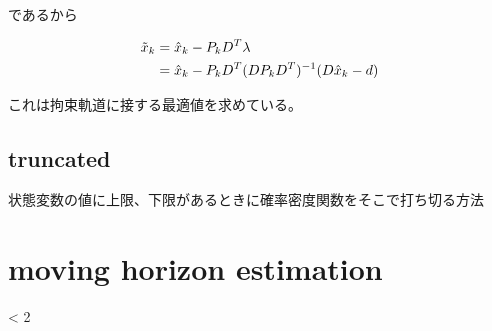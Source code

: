 であるから

\begin{align}
\tilde{x}_k
&=
\hat{x}_k - P_k D^T \lambda 			\notag\\
&=
\hat{x}_k - P_k D^T (DP_k D^T)^{-1}(D\hat{x}_k-d)
\end{align}

これは拘束軌道に接する最適値を求めている。

\subsection{truncated}
状態変数の値に上限、下限があるときに確率密度関数をそこで打ち切る方法


\section{moving horizon estimation}












\ifnum {} < 2

\fi